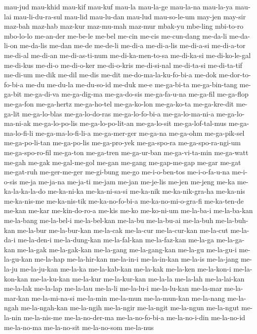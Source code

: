 {mau-jud mau-khid mau-kif mau-kuf mau-la mau-la-ge mau-la-na mau-la-ya
mau-lai mau-li-du-ra-sul mau-lid mau-lu-dan mau-lud mau-so-le-um may-jen
may-sir maz-bah maz-hab maz-kur maz-mu-mah maz-mur mbak-yu mbe-ling
mbi-to-ro mbo-lo-lo me-an-der me-be-le me-bel me-cin me-cis me-cun-dang
me-da-li me-da-li-on me-da-lis me-dan me-de me-de-li me-di-a me-di-a-lis
me-di-a-si me-di-a-tor me-di-al me-di-an me-di-as-ti-num
me-di-ka-men-to-sa me-di-ka-si me-di-ko-le-gal me-di-kus me-di-o
me-di-o-ker me-di-o-kris me-di-si-nal me-di-ta-si me-di-ta-tif me-di-um
me-dik me-dil me-dis me-dit me-do-ma-la-ku-fo-bi-a me-dok
me-dor-to-fo-bi-a me-du me-du-la me-du-so-id me-duk me-e me-ga-bi-ta
me-ga-bin-tang me-ga-bit me-ga-di-va me-ga-dig-ma me-ga-do-sis
me-ga-fa-u-na me-ga-fil me-ga-flop me-ga-fon me-ga-hertz me-ga-ho-tel
me-ga-ko-lon me-ga-ko-ta me-ga-kre-dit me-ga-lit me-ga-lo-blas
me-ga-lo-do-ras me-ga-lo-fo-bi-a me-ga-lo-ma-ni-a me-ga-lo-ma-ni-ak
me-ga-lo-po-lis me-ga-lo-po-lit-an me-ga-lo-sit me-ga-lof-tal-mus
me-ga-ma-lo-fi-li me-ga-ma-lo-fi-li-a me-ga-mer-ger me-ga-na me-ga-ohm
me-ga-pik-sel me-ga-po-li-tan me-ga-po-lis me-ga-pro-yek me-ga-spo-ra
me-ga-spo-ra-ngi-um me-ga-spo-ro-fil me-ga-ton me-ga-tren me-ga-ur-ban
me-ga-vi-ta-min me-ga-watt me-gah me-gak me-gal-me-gol me-gan me-gang
me-gap-me-gap me-gar me-gat me-gat-ruh me-ger-me-ger me-gi-bung me-go
me-i-o-ben-tos me-i-o-fa-u-na me-i-o-sis me-ja me-ja-na me-ja-ti me-jam
me-jan me-je-lis me-jen me-jeng me-ka me-ka-la-ka-la-do me-ka-ni-ka
me-ka-ni-sa-si me-ka-nik me-ka-nik-gra-ha me-ka-nis me-ka-nis-me
me-ka-nis-tik me-ka-no-fo-bi-a me-ka-no-mi-o-gra-fi me-ka-ten-de me-kan
me-kar me-kin-do-ro-a me-kis me-ko me-ko-ni-um me-la-ba-i me-la-ba-kan
me-la-bang me-la-bel-i me-la-bel-kan me-la-bu me-la-bu-ai me-la-buh
me-la-buh-kan me-la-bur me-la-bur-kan me-la-cak me-la-cur me-la-cur-kan
me-la-cut me-la-da-i me-la-den-i me-la-dung-kan me-la-fal-kan
me-la-faz-kan me-la-ga me-la-ga-kan me-la-gak me-la-gak-kan me-la-gang
me-la-gang-kan me-la-gu me-la-gu-i me-la-gu-kan me-la-hap me-la-hir-kan
me-la-in-i me-la-in-kan me-la-is me-la-jang me-la-ju me-la-ju-kan me-la-ka
me-la-kab-kan me-la-kak me-la-ken me-la-kon-i me-la-kon-kan me-la-ku-kan
me-la-kur me-la-kur-kan me-la-la me-la-lah me-la-lai-kan me-la-lak
me-la-lap me-la-lau me-la-li me-la-lu-i me-la-lu-kan me-la-mar
me-la-mar-kan me-la-mi-na-si me-la-min me-la-mun me-la-mun-kan me-la-nang
me-la-ngah me-la-ngah-kan me-la-ngih me-la-ngir me-la-ngit me-la-ngun
me-la-ngut me-la-nin me-la-nis-me me-la-no-der-ma me-la-no-fo-bi-a
me-la-no-i-din me-la-no-id me-la-no-ma me-la-no-sit me-la-no-som me-la-nus
}
